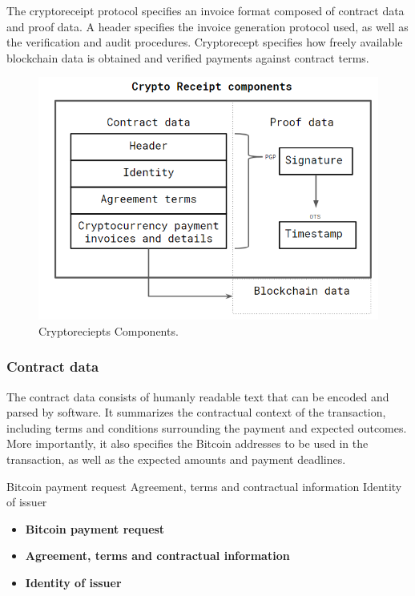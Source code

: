 The cryptoreceipt protocol specifies an invoice format composed of contract data and proof data. A header specifies the invoice generation protocol used, as well as the verification and audit procedures. Cryptorecept specifies how freely available blockchain data is obtained and verified payments against contract terms.


\begin{figure}[h]
\centering
\includegraphics[width=\linewidth]{figures/cryptoreciepts_components.png}
\caption{Cryptoreciepts Components.\label{fig:components}}
\end{figure}


\subsubsection{Contract data}

The contract data consists of humanly readable text that can be encoded and parsed by software. It summarizes the contractual context of the transaction, including terms and conditions surrounding the payment and expected outcomes. More importantly, it also specifies the Bitcoin addresses to be used in the transaction, as well as the expected amounts and payment deadlines. 

Bitcoin payment request
Agreement, terms and contractual information
Identity of issuer

\begin{itemize}

\item \textbf{Bitcoin payment request}

\item \textbf{Agreement, terms and contractual information}

\item \textbf{Identity of issuer}


\end{itemize}


